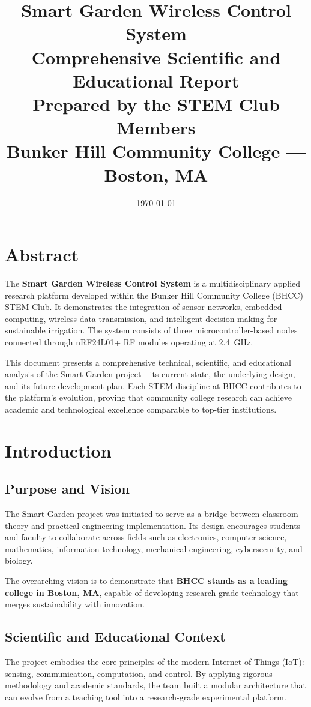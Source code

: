 \documentclass[12pt,a4paper]{article}
\title{\textbf{Smart Garden Wireless Control System}\\[4pt]
Comprehensive Scientific and Educational Report\\[4pt]
\large Prepared by the STEM Club Members\\
Bunker Hill Community College — Boston, MA}
\author{}
\date{\today}
\begin{document}
\maketitle
\tableofcontents
\newpage

\section*{Abstract}
The \textbf{Smart Garden Wireless Control System} is a multidisciplinary applied research platform developed within the Bunker Hill Community College (BHCC) STEM Club. It demonstrates the integration of sensor networks, embedded computing, wireless data transmission, and intelligent decision-making for sustainable irrigation. The system consists of three microcontroller-based nodes connected through nRF24L01+ RF modules operating at 2.4~GHz. 

This document presents a comprehensive technical, scientific, and educational analysis of the Smart Garden project—its current state, the underlying design, and its future development plan. Each STEM discipline at BHCC contributes to the platform’s evolution, proving that community college research can achieve academic and technological excellence comparable to top-tier institutions.

\clearpage
\section{Introduction}

\subsection{Purpose and Vision}
The Smart Garden project was initiated to serve as a bridge between classroom theory and practical engineering implementation. Its design encourages students and faculty to collaborate across fields such as electronics, computer science, mathematics, information technology, mechanical engineering, cybersecurity, and biology.

The overarching vision is to demonstrate that \textbf{BHCC stands as a leading college in Boston, MA}, capable of developing research-grade technology that merges sustainability with innovation.

\subsection{Scientific and Educational Context}
The project embodies the core principles of the modern Internet of Things (IoT): sensing, communication, computation, and control. By applying rigorous methodology and academic standards, the team built a modular architecture that can evolve from a teaching tool into a research-grade experimental platform.
\end{document}
